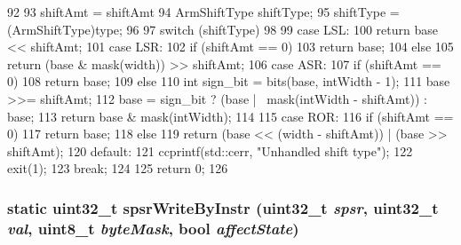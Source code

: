 \begin{DoxyCode}
92 {
93     shiftAmt = shiftAmt %
94     ArmShiftType shiftType;
95     shiftType = (ArmShiftType)type;
96 
97     switch (shiftType)
98     {
99       case LSL:
100         return base << shiftAmt;
101       case LSR:
102         if (shiftAmt == 0)
103             return base;
104         else
105             return (base & mask(width)) >> shiftAmt;
106       case ASR:
107         if (shiftAmt == 0) {
108             return base;
109         } else {
110             int sign_bit = bits(base, intWidth - 1);
111             base >>= shiftAmt;
112             base = sign_bit ? (base | ~mask(intWidth - shiftAmt)) : base;
113             return base & mask(intWidth);
114         }
115       case ROR:
116         if (shiftAmt == 0)
117             return base;
118         else
119             return (base << (width - shiftAmt)) | (base >> shiftAmt);
120       default:
121         ccprintf(std::cerr, "Unhandled shift type\n");
122         exit(1);
123         break;
124     }
125     return 0;
126 }
\end{DoxyCode}
\hypertarget{classArmISA_1_1ArmStaticInst_a2fd5209011bb73f8cccbb7c3ff60a553}{
\subsubsection[{spsrWriteByInstr}]{\setlength{\rightskip}{0pt plus 5cm}static {\bf uint32\_\-t} spsrWriteByInstr ({\bf uint32\_\-t} {\em spsr}, \/  {\bf uint32\_\-t} {\em val}, \/  uint8\_\-t {\em byteMask}, \/  bool {\em affectState})}}
\label{classArmISA_1_1ArmStaticInst_a2fd5209011bb73f8cccbb7c3ff60a553}



